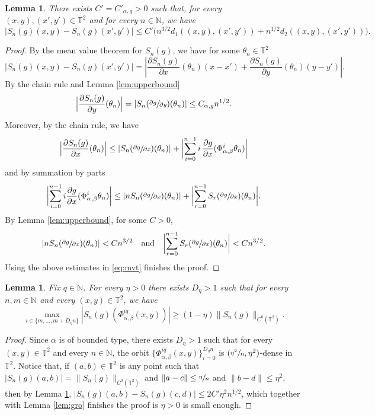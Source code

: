 \documentclass[JEP,XML,SOM,Unicode,NoEqCountersInSection]{cedram}
\theoremstyle{definition}
\theoremstyle{plain}
\newtheorem{lemma}[definition]{Lemma}
\newcommand\NN{\mathbb{N}}
\newcommand\TT{\mathbb{T}}
\begin{document}
\begin{lemma}\label{lem:diver} There exists $C'=C'_{\alpha,g}>0$ such that, for every $(x,y),(x',y')\in \TT^2$ and for every $n\in \NN$, we have
\[
|S_{n}(g)(x,y)-S_{n}(g)(x',y')|\leq C'\bigl(n^{3/2}d_1((x,y),(x',y'))+n^{1/2}d_2((x,y),(x',y'))\bigr).
\]
\end{lemma}
\begin{proof} By the mean value theorem for $S_{n}(g)$, we have for some $\theta_n\in \TT^2$
\begin{equation}\label{eq:mvt}
|S_{n}(g)(x,y)-S_{n}(g)(x',y')|=\left|\frac{\partial S_{n}(g)}{\partial x}(\theta_n)(x-x')+
\frac{\partial S_{n}(g)}{\partial y}(\theta_n)(y-y')\right|.
\end{equation}
By the chain rule and Lemma \ref{lem:upperbound}
\[
\Bigl|\frac{\partial S_{n}(g)}{\partial y}(\theta_n)\Bigr|=|S_n(\sfrac{\partial g}{\partial y})(\theta_n)|\leq C_{\alpha,g}n^{1/2}.
\]
Moreover, by the chain rule, we have
\[
\Bigl|\frac{\partial S_{n}(g)}{\partial x}(\theta_n)\Bigr|\leq
|S_n(\sfrac{\partial g}{\partial x})(\theta_n)|+
\biggl|\sum_{i=0}^{n-1}i\,\frac{\partial g}{\partial x}(\Phi_{\alpha,\beta} ^i\theta_n)\biggr|
\]
and by summation by parts
\[
\biggl|\sum_{i=0}^{n-1}i\frac{\partial g}{\partial x}(\Phi_{\alpha,\beta} ^i\theta_n)\biggr|\leq
|nS_n(\sfrac{\partial g}{\partial x})(\theta_n)|+\biggl|\sum_{r=0}^{n-1}S_r(\sfrac{\partial g}{\partial x})(\theta_n)\biggr|.
\]
By Lemma \ref{lem:upperbound}, for some $C>0$,
\[
|nS_n(\sfrac{\partial g}{\partial x})(\theta_n)|<Cn^{3/2}\quad\text{and} \quad
\biggl|\sum_{r=0}^{n-1}S_r(\sfrac{\partial g}{\partial x})(\theta_n)\biggr|<Cn^{3/2}.
\]
Using the above estimates in \eqref{eq:mvt} finishes the proof.
\end{proof}

\begin{lemma}\label{lem:lowbound}Fix $q\in \NN$. For every $\eta>0$ there exists $D_\eta>1$ such that for every $n,m\in \NN$ and every $(x,y)\in \TT^2$, we have
\[
\max_{i\in\{m,\dots,m+D_\eta n\}}|S_{n}(g)(\Phi_{\alpha,\beta}^{iq}(x,y))|\geq (1-\eta)\|S_{n}(g)\|_{C^0(\TT^2)}.
\]
\end{lemma}
\begin{proof} Since $\alpha$ is of bounded type, there exists $D_\eta\!>\!1$ such that for every \hbox{$(x,y)\!\in\!\TT^2$} and every $n\in \NN$, the orbit $\{\Phi_{\alpha,\beta}^{iq}(x,y)\}_{i=0}^{D_\eta n}$ is $(\sfrac{\eta^2}{n},\eta^2)$-dense in $\TT^2$. Notice that, if $(a,b)\in \TT^2$ is any point such that
$|S_n(g)(a,b)|=\|S_{n}(g)\|_{C^0(\TT^2)}$ and $\|a-c\|\leq \sfrac{\eta}{n}$ and $\|b-d\|\leq \eta^2$, then by Lemma \ref{lem:diver},
$|S_n(g)(a,b)-S_n(g)(c,d)|\leq 2C'\eta^2 n^{1/2}$, which together with Lemma \ref{lem:gro} finishes the proof is $\eta>0$ is small enough.
\end{proof}
\end{document}
